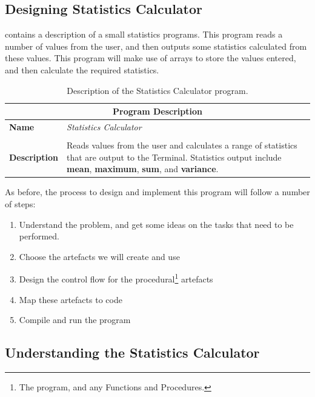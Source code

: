 \subsection{Designing Statistics Calculator} %
\label{sub:designing_statistics_calculator}

 contains a description of a small statistics programs. This program reads a number of values from the user, and then outputs some statistics calculated from these values. This program will make use of arrays to store the values entered, and then calculate the required statistics.

\begin{table}[h]
\centering
\begin{tabular}{l|p{10cm}}
  \hline
  \multicolumn{2}{c}{\textbf{Program Description}} \\
  \hline
  \textbf{Name} & \emph{Statistics Calculator} \\
  \\
  \textbf{Description} & Reads values from the user and calculates a range of statistics that are output to the Terminal. Statistics output include \textbf{mean}, \textbf{maximum}, \textbf{sum}, and \textbf{variance}.\\
  \hline
\end{tabular}
\caption{Description of the Statistics Calculator program.}
\label{tbl:stats-calc-prog}
\end{table}

As before, the process to design and implement this program will follow a number of steps:
\begin{enumerate}
  \item Understand the problem, and get some ideas on the tasks that need to be performed.
  \item Choose the artefacts we will create and use
  \item Design the control flow for the procedural\footnote{The program, and any Functions and Procedures.} artefacts
  \item Map these artefacts to code
  \item Compile and run the program
\end{enumerate}


\subsection{Understanding the Statistics Calculator} %
\label{sub:understanding_the_statistics_calculator}

